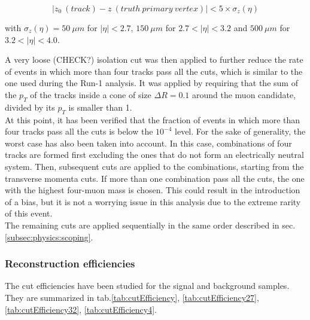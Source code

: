\documentclass[a4paper,twoside,12pt]{article}
\begin{document}
\begin{equation*}
|z_0\ (track) - z\ (truth\ primary\ vertex)| < 5 \times \sigma_{z} (\eta)
\end{equation*}

with $\sigma_{z} (\eta) = 50\ \mu m$ for $|\eta| < 2.7$, $150\ \mu m$ for $2.7 < |\eta| < 3.2$
and $500\ \mu m$ for $3.2 < |\eta| < 4.0$. 

A very loose (CHECK?) isolation cut was then applied to further reduce the rate of events
in which more than four tracks pass all the cuts, which is similar to the one used during
the Run-1 analysis\cite{HZZ4mu_run1}. It was applied by requiring that the sum of the 
$p_T$ of the tracks inside a cone of size $\Delta R = 0.1$ around the muon
candidate, divided by its $p_T$ is smaller than 1.\\

At this point, it has been verified that the fraction of events in which more than four tracks
pass all the cuts is below the $10^{-4}$ level. For the sake of generality, the worst 
case has also been taken into account. In this case, combinations of four tracks are formed
first excluding the ones that do not form an electrically neutral system. Then, subsequent
cuts are applied to the combinations, starting from the transverse momenta cuts. If more
than one combination pass all the cuts, the one with the highest four-muon mass is chosen. 
This could result in the introduction of a bias, but it is not a worrying issue in this analysis due to
the extreme rarity of this event.\\

The remaining cuts are applied sequentially in the same order described in sec.\ref{subsec:physics:scoping}.

\subsubsection{Reconstruction efficiencies}\label{subsec:recoEfficiency}

The cut efficiencies have been studied for the signal and background samples. They are summarized in 
tab.\ref{tab:cutEfficiency}, \ref{tab:cutEfficiency27}, \ref{tab:cutEfficiency32}, \ref{tab:cutEfficiency4}.\\
\end{document}
